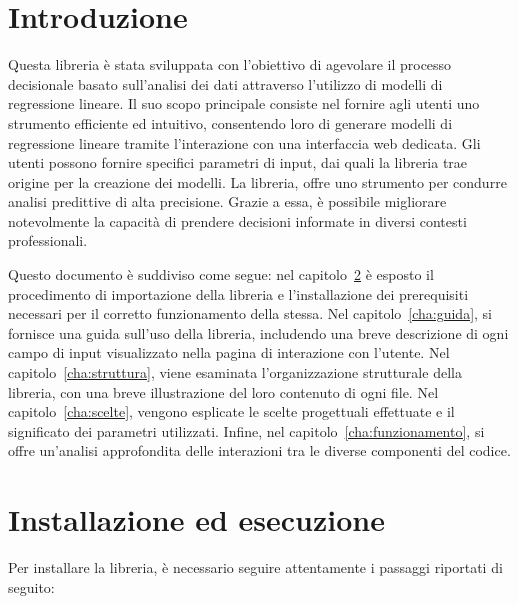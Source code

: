 \documentclass{rapportECL}
\begin{document}


        
\margins 
\mytitlepage
{}
\toc 
\fig



\cleardoublepage 

\chapter{Introduzione}
\label{cha:intro}

Questa libreria è stata sviluppata con l'obiettivo di agevolare il processo decisionale basato sull'analisi dei dati attraverso l'utilizzo 
di modelli di regressione lineare. Il suo scopo principale consiste nel fornire agli utenti uno strumento efficiente ed intuitivo, 
consentendo loro di generare modelli di regressione lineare tramite l'interazione con una interfaccia web dedicata.
Gli utenti possono fornire specifici parametri di input, dai quali la libreria trae origine per la creazione dei modelli.
La libreria, offre uno strumento per condurre analisi predittive di alta precisione. 
Grazie a essa, è possibile migliorare notevolmente la capacità di prendere decisioni informate in diversi contesti professionali.

Questo documento è suddiviso come segue: nel capitolo~\ref{cha:import} è esposto il procedimento di importazione della libreria 
e l'installazione dei prerequisiti necessari per il corretto funzionamento della stessa. 
Nel capitolo~\ref{cha:guida}, si fornisce una guida sull'uso della libreria, includendo una breve descrizione di ogni campo di input visualizzato 
nella pagina di interazione con l'utente. Nel capitolo~\ref{cha:struttura}, viene esaminata l'organizzazione strutturale della libreria, 
con una breve illustrazione del loro contenuto di ogni file. Nel capitolo~\ref{cha:scelte}, vengono esplicate le scelte progettuali effettuate 
e il significato dei parametri utilizzati. Infine, nel capitolo~\ref{cha:funzionamento}, si offre un'analisi approfondita delle interazioni tra 
le diverse componenti del codice.

\chapter{Installazione ed esecuzione}
\label{cha:import}

Per installare la libreria, è necessario seguire attentamente i passaggi riportati di seguito:
\end{document}
